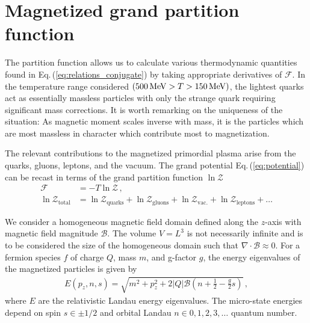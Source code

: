 \documentclass[epjST]{svjour}
\newcommand*{\MeV}{\text{\,MeV}}
\newcommand{\req}[1]{Eq.\,(\ref{#1})}
\numberwithin{equation}{section}
\begin{document}
\section{Magnetized grand partition function}
\label{sec:partition}
The partition function allows us to calculate various thermodynamic quantities found in \req{eq:relations_conjugate} by taking appropriate derivatives of $\mathcal{F}$. In the temperature range considered $(500\MeV>T>150\MeV)$, the lightest quarks act as essentially massless particles with only the strange quark requiring significant mass corrections. It is worth remarking on the uniqueness of the situation: As magnetic moment scales inverse with mass, it is the particles which are most massless in character which contribute most to magnetization.

The relevant contributions to the magnetized primordial plasma arise from the quarks, gluons, leptons, and the vacuum. The grand potential \req{eq:potential} can be recast in terms of the grand partition function $\ln\mathcal{Z}$
\begin{align}
    \label{eq:parts}
    \mathcal{F} &= -T\ln\mathcal{Z}\,,\\
    \ln\mathcal{Z}_{\mathrm{total}} &=
    \ln\mathcal{Z}_{\mathrm{quarks}} +
    \ln\mathcal{Z}_{\mathrm{gluons}} +
    \ln\mathcal{Z}_{\mathrm{vac.}} + 
    \ln\mathcal{Z}_{\mathrm{leptons}}+\ldots 
\end{align}

We consider a homogeneous magnetic field domain defined along the $z$-axis with magnetic field magnitude $\mathcal{B}$. The volume $V=L^{3}$ is not necessarily infinite and is to be considered the size of the homogeneous domain such that $\nabla\cdot\mathcal{B}\approx0$. For a fermion species $f$ of charge $Q$, mass $m$, and g-factor $g$, the energy eigenvalues of the magnetized particles is given by~\cite{Steinmetz:2018ryf}
\begin{align}
    \label{eq:energystates}
    E(p_{z},n,s)=\sqrt{m^{2}+p_{z}^{2}+2|Q|\mathcal{B}\left(n+\frac{1}{2}-\frac{g}{2}s\right)}\,,
\end{align}
where $E$ are the relativistic Landau energy eigenvalues. The micro-state energies depend on spin $s\in\pm1/2$ and orbital Landau $n\in0,1,2,3,\ldots$ quantum number.

\end{document}
